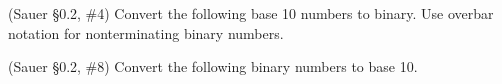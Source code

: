 \documentclass[12pt,fleqn]{exam}
\begin{document}
\begin{questions}

\question (Sauer \S0.2, \#4) Convert the following base 10 numbers to binary. Use overbar notation for nonterminating binary numbers.

\question (Sauer \S0.2, \#8) Convert the following binary numbers to base 10.


\end{questions}
\end{document}

